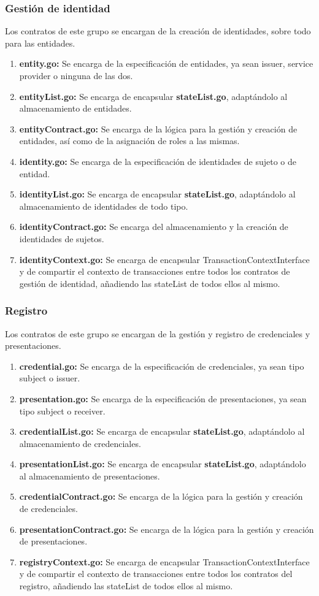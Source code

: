 \subsubsection{Gestión de identidad}
Los contratos de este grupo se encargan de la creación de identidades, sobre todo para las entidades.
\begin{enumerate}
    \item \textbf{entity.go:} Se encarga de la especificación de entidades, ya sean issuer, service provider o ninguna de las dos.
    \item \textbf{entityList.go:} Se encarga de encapsular \textbf{stateList.go}, adaptándolo al almacenamiento de entidades.
    \item \textbf{entityContract.go:} Se encarga de la lógica para la gestión y creación de entidades, así como de la asignación de roles a las mismas.
    \item \textbf{identity.go:} Se encarga de la especificación de identidades de sujeto o de entidad.
    \item \textbf{identityList.go:}  Se encarga de encapsular \textbf{stateList.go}, adaptándolo al almacenamiento de identidades de todo tipo.
    \item \textbf{identityContract.go:} Se encarga del almacenamiento y la creación de identidades de sujetos.
    \item \textbf{identityContext.go:} Se encarga de encapsular TransactionContextInterface y de compartir el contexto de transacciones entre todos los contratos de gestión de identidad, añadiendo las stateList de todos ellos al mismo.
\end{enumerate}
\subsubsection{Registro}
Los contratos de este grupo se encargan de la gestión y registro de credenciales y presentaciones.
\begin{enumerate}
    \item \textbf{credential.go:} Se encarga de la especificación de credenciales, ya sean tipo subject o issuer.
    \item \textbf{presentation.go:} Se encarga de la especificación de presentaciones, ya sean tipo subject o receiver.
    \item \textbf{credentialList.go:} Se encarga de encapsular \textbf{stateList.go}, adaptándolo al almacenamiento de credenciales.
    \item \textbf{presentationList.go:} Se encarga de encapsular \textbf{stateList.go}, adaptándolo al almacenamiento de presentaciones.
    \item \textbf{credentialContract.go:} Se encarga de la lógica para la gestión y creación de credenciales.
    \item \textbf{presentationContract.go:} Se encarga de la lógica para la gestión y creación de presentaciones.
    \item \textbf{registryContext.go:} Se encarga de encapsular TransactionContextInterface y de compartir el contexto de transacciones entre todos los contratos del registro, añadiendo las stateList de todos ellos al mismo.
\end{enumerate}

